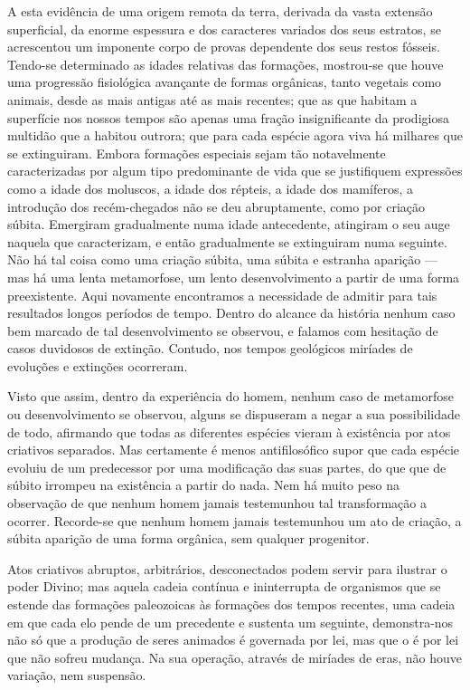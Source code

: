 \documentclass[11pt,a5paper,twoside,openany]{book}
\begin{document}
A esta evidência de uma origem remota da terra, derivada da vasta extensão superficial, da enorme espessura e dos caracteres variados dos seus estratos, se acrescentou um imponente corpo de provas dependente dos seus restos fósseis. Tendo-se determinado as idades relativas das formações, mostrou-se que houve uma progressão fisiológica avançante de formas orgânicas, tanto vegetais como animais, desde as mais antigas até as mais recentes; que as que habitam a superfície nos nossos tempos são apenas uma fração insignificante da prodigiosa multidão que a habitou outrora; que para cada espécie agora viva há milhares que se extinguiram. Embora formações especiais sejam tão notavelmente caracterizadas por algum tipo predominante de vida que se justifiquem expressões como a idade dos moluscos, a idade dos répteis, a idade dos mamíferos, a introdução dos recém-chegados não se deu abruptamente, como por criação súbita. Emergiram gradualmente numa idade antecedente, atingiram o seu auge naquela que caracterizam, e então gradualmente se extinguiram numa seguinte. Não há tal coisa como uma criação súbita, uma súbita e estranha aparição — mas há uma lenta metamorfose, um lento desenvolvimento a partir de uma forma preexistente. Aqui novamente encontramos a necessidade de admitir para tais resultados longos períodos de tempo. Dentro do alcance da história nenhum caso bem marcado de tal desenvolvimento se observou, e falamos com hesitação de casos duvidosos de extinção. Contudo, nos tempos geológicos miríades de evoluções e extinções ocorreram.

Visto que assim, dentro da experiência do homem, nenhum caso de metamorfose ou desenvolvimento se observou, alguns se dispuseram a negar a sua possibilidade de todo, afirmando que todas as diferentes espécies vieram à existência por atos criativos separados. Mas certamente é menos antifilosófico supor que cada espécie evoluiu de um predecessor por uma modificação das suas partes, do que que de súbito irrompeu na existência a partir do nada. Nem há muito peso na observação de que nenhum homem jamais testemunhou tal transformação a ocorrer. Recorde-se que nenhum homem jamais testemunhou um ato de criação, a súbita aparição de uma forma orgânica, sem qualquer progenitor.

Atos criativos abruptos, arbitrários, desconectados podem servir para ilustrar o poder Divino; mas aquela cadeia contínua e ininterrupta de organismos que se estende das formações paleozoicas às formações dos tempos recentes, uma cadeia em que cada elo pende de um precedente e sustenta um seguinte, demonstra-nos não só que a produção de seres animados é governada por lei, mas que o é por lei que não sofreu mudança. Na sua operação, através de miríades de eras, não houve variação, nem suspensão.
\end{document}
